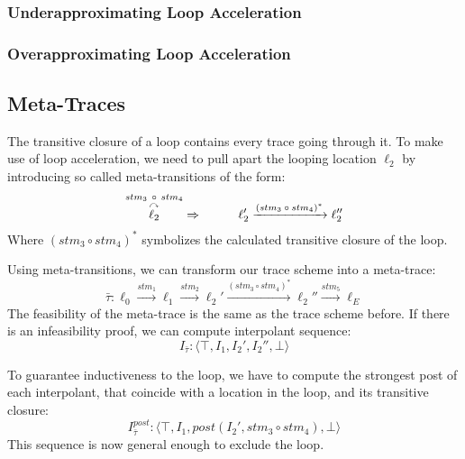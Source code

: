 \documentclass{article}
\newcommand\mycom[1]{}
\newcommand\mycom[1]{#1}
\newcommand{\jw}[1]{\mycom{\todo[color=blue!40,inline]{\small JW: #1}}}
\begin{document}
\subsubsection{Underapproximating Loop Acceleration}

\subsubsection{Overapproximating Loop Acceleration}

\subsection{Meta-Traces}
The transitive closure of a loop contains every trace going through it. To make use of loop acceleration, we need to pull apart the looping location $\ell_2$ by introducing so called meta-transitions of the form:
\begin{equation*}
	\overset{stm_3\ \circ \ stm_4}{\overset{\curvearrowright}{\ell_2}} \Rightarrow \hspace*{1cm} \ell_2' \xrightarrow{\text{$(stm_3 \circ stm_4)^*$}} \ell_2''
\end{equation*}
Where $(stm_3 \circ stm_4)^*$ symbolizes the calculated transitive closure of the loop. \par
Using meta-transitions, we can transform our trace scheme into a meta-trace:
\begin{equation*}
	\bar{\tau}: \ell_0 \xrightarrow{\text{$stm_1$}} \ell_1 \xrightarrow{\text{$stm_2$}} \ell_2' \xrightarrow{\text{$(stm_3 \circ stm_4)^*$}} \ell_2'' \xrightarrow{\text{$stm_5$}} \ell_E
\end{equation*}
The feasibility of the meta-trace is the same as the trace scheme before. If there is an infeasibility proof, we can compute interpolant sequence:
\begin{equation*}
I_{\bar{\tau}}: \langle \top, I_1, I_2', I_2'', \bot  \rangle
\end{equation*}
\jw{todo: Why?}
To guarantee inductiveness to the loop, we have to compute the strongest post of each interpolant, that coincide with a location in the loop, and its transitive closure:
\begin{equation*}
I_{\bar{\tau}}^{post}: \langle \top, I_1, post(I_2', stm_3 \circ stm_4), \bot  \rangle
\end{equation*}
This sequence is now general enough to exclude the loop.
\end{document}
